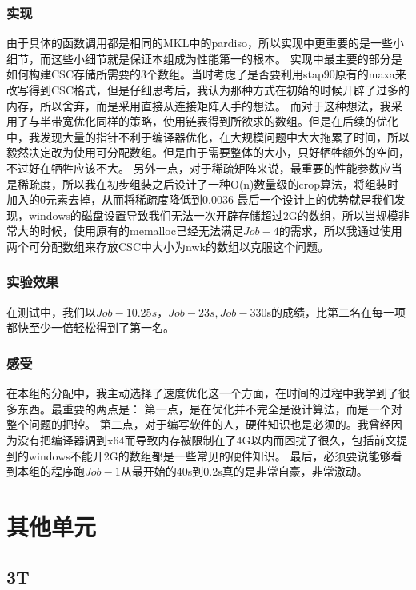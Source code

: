 \documentclass[UTF8]{ctexbook}
\begin{document}
\subsubsection{实现}
由于具体的函数调用都是相同的MKL中的pardiso，所以实现中更重要的是一些小细节，而这些小细节就是保证本组成为性能第一的根本。
实现中最主要的部分是如何构建CSC存储所需要的3个数组。当时考虑了是否要利用stap90原有的maxa来改写得到CSC格式，但是仔细思考后，我认为那种方式在初始的时候开辟了过多的内存，所以舍弃，而是采用直接从连接矩阵入手的想法。
而对于这种想法，我采用了与半带宽优化同样的策略，使用链表得到所欲求的数组。但是在后续的优化中，我发现大量的指针不利于编译器优化，在大规模问题中大大拖累了时间，所以毅然决定改为使用可分配数组。但是由于需要整体的大小，只好牺牲额外的空间，不过好在牺牲应该不大。
另外一点，对于稀疏矩阵来说，最重要的性能参数应当是稀疏度，所以我在初步组装之后设计了一种O(n)数量级的crop算法，将组装时加入的0元素去掉，从而将稀疏度降低到0.0036%
最后一个设计上的优势就是我们发现，windows的磁盘设置导致我们无法一次开辟存储超过2G的数组，所以当规模非常大的时候，使用原有的memalloc已经无法满足$Job-4$的需求，所以我通过使用两个可分配数组来存放CSC中大小为nwk的数组以克服这个问题。
\subsubsection{实验效果}
在测试中，我们以$Job-1 0.25s，Job-2 3s, Job-3 $30s的成绩，比第二名在每一项都快至少一倍轻松得到了第一名。
\subsubsection{感受}
在本组的分配中，我主动选择了速度优化这一个方面，在时间的过程中我学到了很多东西。最重要的两点是：
第一点，是在优化并不完全是设计算法，而是一个对整个问题的把控。
第二点，对于编写软件的人，硬件知识也是必须的。我曾经因为没有把编译器调到x64而导致内存被限制在了4G以内而困扰了很久，包括前文提到的windows不能开2G的数组都是一些常见的硬件知识。
最后，必须要说能够看到本组的程序跑$Job-1$从最开始的40s到0.2s真的是非常自豪，非常激动。


\section{其他单元}
\subsection{3T}
\end{document}
